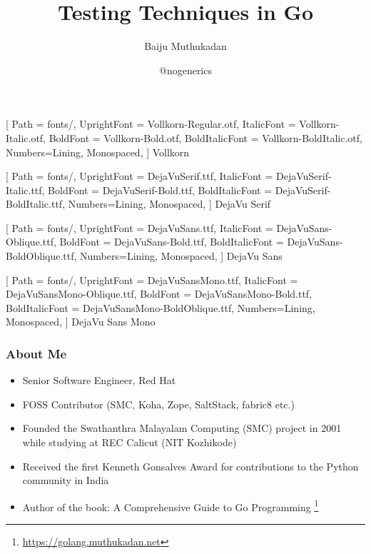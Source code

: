 \documentclass[aspectratio=169]{beamer}
\title{Testing Techniques in Go}
\author{Baiju Muthukadan}
\institute{Red Hat}
\date{@nogenerics}
\begin{document}
\beamertemplatenavigationsymbolsempty

\setmainfont
[ Path = fonts/,
UprightFont = DejaVuSerif.ttf,
ItalicFont = DejaVuSerif-Italic.ttf,
BoldFont = DejaVuSerif-Bold.ttf,
BoldItalicFont = DejaVuSerif-BoldItalic.ttf,
Numbers={Lining, Monospaced},
] {DejaVu Serif}

\setsansfont
[ Path = fonts/,
UprightFont = DejaVuSans.ttf,
ItalicFont = DejaVuSans-Oblique.ttf,
BoldFont = DejaVuSans-Bold.ttf,
BoldItalicFont = DejaVuSans-BoldOblique.ttf,
Numbers={Lining, Monospaced},
] {DejaVu Sans}

\setmonofont
[ Path = fonts/,
UprightFont = DejaVuSansMono.ttf,
ItalicFont = DejaVuSansMono-Oblique.ttf,
BoldFont = DejaVuSansMono-Bold.ttf,
BoldItalicFont = DejaVuSansMono-BoldOblique.ttf,
Numbers={Lining, Monospaced},
] {DejaVu Sans Mono}


\newfontfamily{\vollkorn}
[ Path = fonts/,
UprightFont = Vollkorn-Regular.otf,
ItalicFont = Vollkorn-Italic.otf,
BoldFont = Vollkorn-Bold.otf,
BoldItalicFont = Vollkorn-BoldItalic.otf,
Numbers={Lining, Monospaced},
] {Vollkorn}

\newfontfamily{\dejavuserif}
[ Path = fonts/,
UprightFont = DejaVuSerif.ttf,
ItalicFont = DejaVuSerif-Italic.ttf,
BoldFont = DejaVuSerif-Bold.ttf,
BoldItalicFont = DejaVuSerif-BoldItalic.ttf,
Numbers={Lining, Monospaced},
] {DejaVu Serif}

\newfontfamily{\dejavusans}
[ Path = fonts/,
UprightFont = DejaVuSans.ttf,
ItalicFont = DejaVuSans-Oblique.ttf,
BoldFont = DejaVuSans-Bold.ttf,
BoldItalicFont = DejaVuSans-BoldOblique.ttf,
Numbers={Lining, Monospaced},
] {DejaVu Sans}

\newfontfamily{\dejavumono}
[ Path = fonts/,
UprightFont = DejaVuSansMono.ttf,
ItalicFont = DejaVuSansMono-Oblique.ttf,
BoldFont = DejaVuSansMono-Bold.ttf,
BoldItalicFont = DejaVuSansMono-BoldOblique.ttf,
Numbers={Lining, Monospaced},
] {DejaVu Sans Mono}

\frame{\titlepage}

\begin{frame}
  \frametitle{About Me}

  \begin{itemize}
  \item<1-> Senior Software Engineer, Red Hat
  \item<2-> FOSS Contributor (SMC, Koha, Zope, SaltStack, fabric8 etc.)
  \item<3-> Founded the Swathanthra Malayalam Computing (SMC) project in 2001 while studying at REC Calicut (NIT Kozhikode)
  \item<4-> Received the first Kenneth Gonsalves Award for contributions to the Python community in India
  \item<5-> Author of the book: A Comprehensive Guide to Go Programming \footnote{\url{https://golang.muthukadan.net}}
  \end{itemize}

\end{frame}
\end{document}
